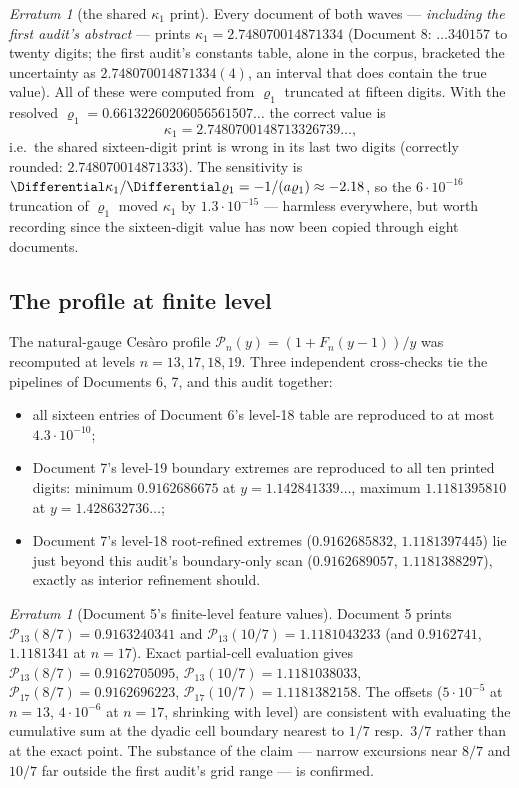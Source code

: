 \documentclass[11pt,oneside]{article}
\theoremstyle{definition}
\theoremstyle{remark}
\newtheorem{erratum}[theorem]{Erratum}
\begin{document}
\begin{erratum}[the shared $\kappa_1$ print]
\label{err:kappa1}
Every document of both waves --- \emph{including the first audit's
abstract} --- prints $\kappa_1=2.748070014871334$ (Document 8:
$\ldots340157$ to twenty digits; the first audit's constants table,
alone in the corpus, bracketed the uncertainty as
$2.748070014871334(4)$, an interval that does contain the true value).
All of these were computed from $\varrho_1$ truncated at fifteen
digits.  With the resolved
$\varrho_1=0.66132260206056561507\ldots$ the correct value is
\[
 \kappa_1=2.7480700148713326739\ldots,
\]
i.e.\ the shared sixteen-digit print is wrong in its last two digits
(correctly rounded: $2.748070014871333$).  The sensitivity is
$\Differential\kappa_1/\Differential\varrho_1=-1/(a\varrho_1)\approx-2.18$, so the
$6\cdot10^{-16}$ truncation of $\varrho_1$ moved $\kappa_1$ by
$1.3\cdot10^{-15}$ --- harmless everywhere, but worth recording since
the sixteen-digit value has now been copied through eight documents.
\end{erratum}

\subsection{The profile at finite level}
\label{ssec:profile-numerics}

The natural-gauge Ces\`aro profile
$\mathscr P_n(y)=(1+F_n(y-1))/y$ was recomputed at levels
$n=13,17,18,19$.  Three independent cross-checks tie the pipelines of
Documents 6, 7, and this audit together:
\begin{itemize}
\item all sixteen entries of Document 6's level-18 table are reproduced
to at most $4.3\cdot10^{-10}$;
\item Document 7's level-19 boundary extremes are reproduced to all ten
printed digits: minimum $0.9162686675$ at
$y=1.142841339\ldots$, maximum $1.1181395810$ at $y=1.428632736\ldots$;
\item Document 7's level-18 root-refined extremes
($0.9162685832$, $1.1181397445$) lie just beyond this audit's
boundary-only scan ($0.9162689057$, $1.1181388297$), exactly as
interior refinement should.
\end{itemize}

\begin{erratum}[Document 5's finite-level feature values]
\label{err:doc5-features}
Document 5 prints $\mathscr P_{13}(8/7)=0.9163240341$ and
$\mathscr P_{13}(10/7)=1.1181043233$ (and $0.9162741$, $1.1181341$ at
$n=17$).  Exact partial-cell evaluation gives
$\mathscr P_{13}(8/7)=0.9162705095$,
$\mathscr P_{13}(10/7)=1.1181038033$,
$\mathscr P_{17}(8/7)=0.9162696223$,
$\mathscr P_{17}(10/7)=1.1181382158$.  The offsets
($5\cdot10^{-5}$ at $n=13$, $4\cdot10^{-6}$ at $n=17$, shrinking with
level) are consistent with evaluating the cumulative sum at the dyadic
cell boundary nearest to $1/7$ resp.\ $3/7$ rather than at the exact
point.  The substance of the claim --- narrow excursions near $8/7$ and
$10/7$ far outside the first audit's grid range --- is confirmed.
\end{erratum}
\end{document}
